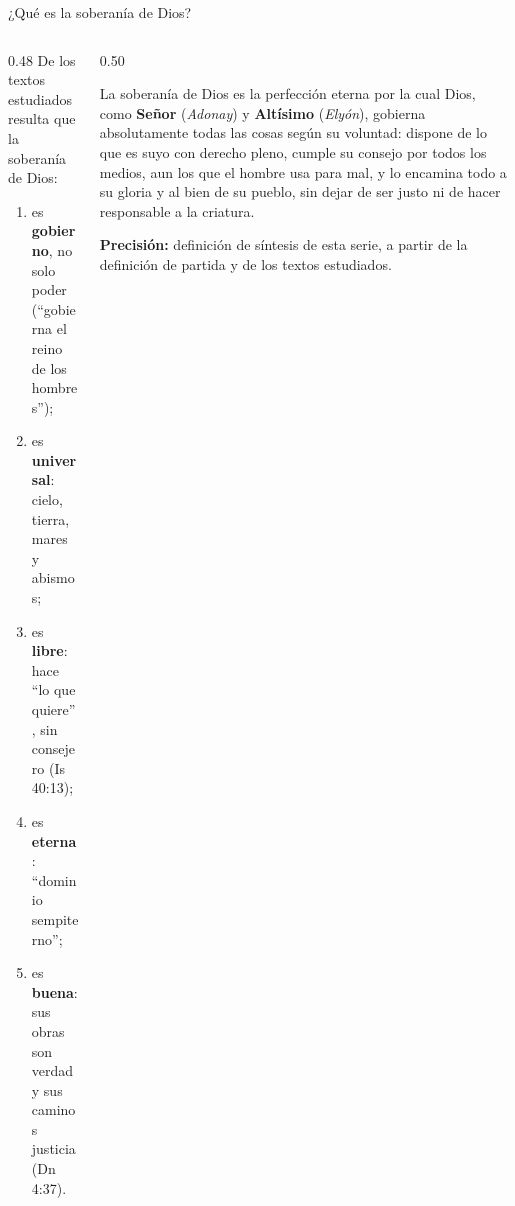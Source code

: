 \documentclass[hyperref={bookmarks=false},aspectratio=169]{beamer}
\newcommand{\destacar}[1]{\textbf{\textcolor{azul}{#1}}}
\newcommand{\precision}[1]{{\footnotesize\color{gris}\textbf{Precisión:} #1}}
\begin{document}
\begin{frame}{¿Qué es la soberanía de Dios?}
\begin{columns}[c,onlytextwidth]
\begin{column}{0.48\textwidth}\small
De los textos estudiados resulta que la soberanía de Dios:
\begin{enumerate}
\item es \destacar{gobierno}, no solo poder (``gobierna el reino de los hombres'');
\item es \destacar{universal}: cielo, tierra, mares y abismos;
\item es \destacar{libre}: hace ``lo que quiere'', sin consejero (Is 40:13);
\item es \destacar{eterna}: ``dominio sempiterno'';
\item es \destacar{buena}: sus obras son verdad y sus caminos justicia (Dn 4:37).
\end{enumerate}
\end{column}
\begin{column}{0.50\textwidth}
\begin{tcolorbox}[colback=papiro,colframe=azul,boxrule=1pt,arc=3pt,title={\small Definición},colbacktitle=azul,coltitle=papiro]
\small La soberanía de Dios es la perfección eterna por la cual Dios, como \destacar{Señor} (\emph{Adonay}) y \destacar{Altísimo} (\emph{Elyón}), gobierna absolutamente todas las cosas según su voluntad: dispone de lo que es suyo con derecho pleno, cumple su consejo por todos los medios, aun los que el hombre usa para mal, y lo encamina todo a su gloria y al bien de su pueblo, sin dejar de ser justo ni de hacer responsable a la criatura.
\end{tcolorbox}
\precision{definición de síntesis de esta serie, a partir de la definición de partida y de los textos estudiados.}
\end{column}
\end{columns}
\end{frame}
\end{document}
